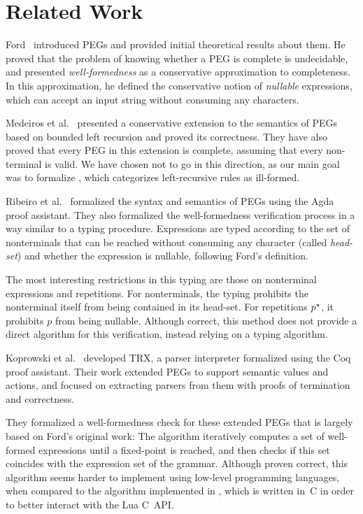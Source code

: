\chapter{Related Work}
\label{chapter:related-work}

Ford~\cite{ford_parsing_2004} introduced PEGs
and provided initial theoretical results about them.
He proved that the problem of knowing whether
a PEG is complete is undecidable,
and presented \emph{well-formedness}
as a conservative approximation to completeness.
In this approximation,
he defined the conservative notion of \emph{nullable} expressions,
which can accept an input string without consuming any characters.

Medeiros et al.~\cite{medeiros_left_2014}
presented a conservative extension to the semantics of PEGs
based on bounded left recursion and proved its correctness.
They have also proved that every PEG in this extension
is complete, assuming that every non-terminal is valid.
We have chosen not to go in this direction,
as our main goal was to formalize \lpeg{},
which categorizes left-recursive rules as ill-formed.

Ribeiro et al.~\cite{ribeiro_towards_2019}
formalized the syntax and semantics of PEGs
using the Agda proof assistant.
They also formalized the well-formedness verification process
in a way similar to a typing procedure.
Expressions are typed according to the set of nonterminals that can
be reached without consuming any character
(called \emph{head-set})
and whether the expression is nullable,
following Ford's definition.

The most interesting restrictions in this typing
are those on nonterminal expressions and repetitions.
For nonterminals, the typing
prohibits the nonterminal itself from being contained in its head-set.
For repetitions $p^\star$, it prohibits $p$ from being nullable.
Although correct, this method does not provide a direct algorithm for this verification, instead relying on a typing algorithm.

Koprowski et al.~\cite{koprowski_trx_2011} developed TRX,
a parser interpreter formalized using the Coq proof assistant.
Their work extended PEGs to support semantic values and actions,
and focused on extracting parsers from them
with proofs of termination and correctness.

They formalized a well-formedness check for these extended PEGs
that is largely based on Ford's original work:
The algorithm iteratively computes
a set of well-formed expressions
until a fixed-point is reached,
and then checks if this set
coincides with the expression set of the grammar.
Although proven correct,
this algorithm seems harder to implement
using low-level programming languages,
when compared to the algorithm implemented in \lpeg{},
which is written in~C in order to better interact with the Lua C~API.

